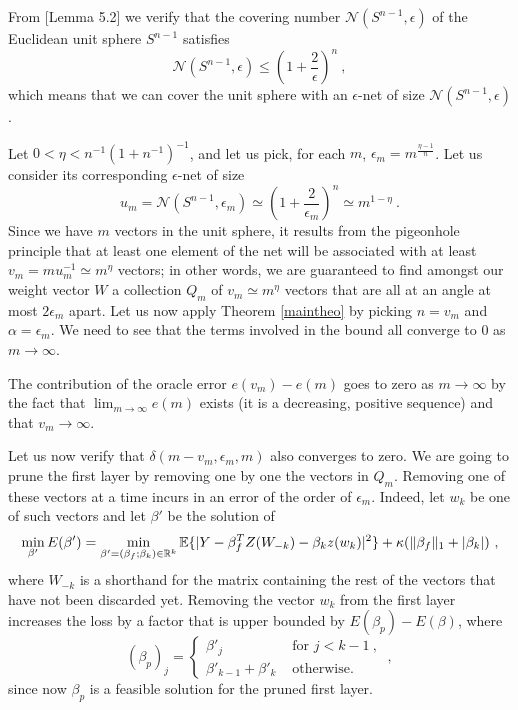 From \cite{vershynin2010introduction} [Lemma 5.2] we verify that the covering number $\mathcal{N}(S^{n-1}, \epsilon)$ of the Euclidean unit sphere $S^{n-1}$ 
satisfies 
$$\mathcal{N}(S^{n-1}, \epsilon) \leq \left( 1 + \frac{2}{\epsilon} \right)^n~,$$
which means that we can cover the unit sphere with an $\epsilon$-net of size $\mathcal{N}(S^{n-1}, \epsilon) $. 

Let $0< \eta < n^{-1} ( 1 + n^{-1})^{-1}$, and let us pick, for each $m$, $\epsilon_m = m^{\frac{\eta-1}{n} }$. 
Let us consider its corresponding $\epsilon$-net of size 
$$u_m = \mathcal{N}(S^{n-1}, \epsilon_m) \simeq \left( 1 + \frac{2}{\epsilon_m} \right)^n \simeq m^{1-\eta} ~.$$
Since we have $m$ vectors in the unit sphere, it results from the pigeonhole principle that at least one 
element of the net will be associated with at least $v_m = m u_m^{-1} \simeq m^{\eta}$ vectors; in other words, 
we are guaranteed to find amongst our weight vector $W$ a collection $Q_m$ of $v_m \simeq m^\eta$ vectors that are all 
at an angle at most $2\epsilon_m$ apart. 
Let us now apply Theorem \ref{maintheo} by picking $n=v_m$ and $\alpha = \epsilon_m$. 
We need to see that the terms involved in the bound all converge to $0$ as $m \to \infty$. 

The contribution of the oracle error $e(v_m) - e(m)$ goes to zero as $m\to \infty$ by the 
fact that $\lim_{m \to \infty} e(m)$ exists (it is a decreasing, positive sequence) and that $v_m \to \infty$.

Let us now verify that $\delta(m - v_m, \epsilon_m, m)$ also converges to zero.
We are going to prune the first layer by removing one by one the vectors in $Q_m$.
Removing one of these vectors at a time incurs in an error of the order of $\epsilon_m$. 
Indeed, let $w_k$ be one of such vectors and let $\beta'$ be the solution of 
$$\min_{\beta'} E(\beta') = \min_{\beta'=(\beta_f;\beta_k) \in {\mathbb{R}}^{k}} {\mathbb{E}} \{ |Y - \beta_f^T Z(W_{-k}) - \beta_k z(w_k)|^2 \} + \kappa ( \| \beta_f \|_1 + |\beta_k| )~, $$
where $W_{-k}$ is a shorthand for the matrix containing the rest of the vectors that have not been discarded yet.
  Removing the vector $w_k$ from the first layer
 increases the loss by a factor that is upper bounded by $E(\beta_p) - E(\beta)$, where 
$$(\beta_p)_j = \left\{
\begin{array}{rl}
 \beta'_j  & \text{ for  } j < k -1 ~,\\
 \beta'_{k-1} + \beta'_{k } & \text{ otherwise.}
\end{array}\right.~, $$
 since now $\beta_p$ is a feasible solution for the pruned first layer.


